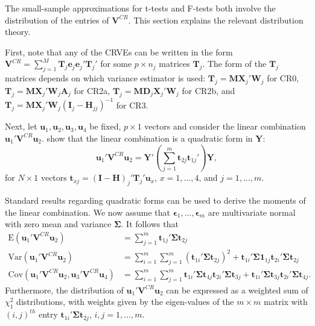 \documentclass[12pt]{article}\usepackage[]{graphicx}\usepackage[]{color}
\newcommand{\E}{\text{E}}
\newcommand{\Cov}{\text{Cov}}
\newcommand{\Var}{\text{Var}}
\newcommand{\bm}{\mathbf}
\newcommand{\bs}{\boldsymbol}
\begin{document}
The small-sample approximations for t-tests and F-tests both involve the distribution of the entries of $\bm{V}^{CR}$. This section explains the relevant distribution theory.

First, note that any of the CRVEs can be written in the form $\bm{V}^{CR} = \sum_{j=1}^M \bm{T}_j \bm{e}_j \bm{e}_j' \bm{T}_j'$ for some $p \times n_j$ matrices $\bm{T}_j$. 
The form of the $\bm{T}_j$ matrices depends on which variance estimator is used: $\bm{T}_j = \bm{M}\bm{X}_j' \bm{W}_j$ for CR0, $\bm{T}_j = \bm{M} \bm{X}_j' \bm{W}_j \bm{A}_j$ for CR2a, $\bm{T}_j = \bm{M} \bm{D}_j \bm{X}_j' \bm{W}_j$ for CR2b, and $\bm{T}_j = \bm{M} \bm{X}_j' \bm{W}_j \left(\bm{I}_j - \bm{H}_{jj}\right)^{-1}$ for CR3.

Next, let $\bm{u}_1,\bm{u}_2,\bm{u}_3,\bm{u}_4$ be fixed, $p \times 1$ vectors and consider the linear combination $\bm{u}_1' \bm{V}^{CR} \bm{u}_2$. 
\citet[Theorem 4]{Bell2002bias} show that the linear combination is a quadratic form in $\bm{Y}$: \[
\bm{u}_1' \bm{V}^{CR} \bm{u}_2 = \bm{Y}'\left(\sum_{j=1}^m \bm{t}_{2j} \bm{t}_{1j}'\right) \bm{Y}, \]
for $N \times 1$ vectors $\bm{t}_{xj} = \left(\bm{I} - \bm{H}\right)_j' \bm{T}_j' \bm{u}_x$, $x = 1,...,4$, and $j = 1,...,m$. 

Standard results regarding quadratic forms can be used to derive the moments of the linear combination. We now assume that $\bs\epsilon_1,...,\bs\epsilon_m$ are multivariate normal with zero mean and variance $\bs\Sigma$. It follows that 
\begin{align}
\E\left(\bm{u}_1' \bm{V}^{CR} \bm{u}_2\right) &= \sum_{j=1}^m \bm{t}_{1j}' \bs\Sigma \bm{t}_{2j} \\
\Var\left(\bm{u}_1' \bm{V}^{CR} \bm{u}_2\right) &= \sum_{i=1}^m \sum_{j=1}^m \left(\bm{t}_{1i}' \bs\Sigma \bm{t}_{2j}\right)^2 + \bm{t}_{1i}' \bs\Sigma \bm{1}_{1j} \bm{t}_{2i}' \bs\Sigma \bm{t}_{2j} \\
\Cov\left(\bm{u}_1' \bm{V}^{CR} \bm{u}_2, \bm{u}_3' \bm{V}^{CR} \bm{u}_4\right) &= \sum_{i=1}^m \sum_{j=1}^m \bm{t}_{1i}' \bs\Sigma \bm{t}_{4j} \bm{t}_{2i}' \bs\Sigma \bm{t}_{3j} + \bm{t}_{1i}' \bs\Sigma \bm{t}_{3j} \bm{t}_{2i}' \bs\Sigma \bm{t}_{4j}.
\end{align}
Furthermore, the distribution of $\bm{u}_1' \bm{V}^{CR} \bm{u}_2$ can be expressed as a weighted sum of $\chi^2_1$ distributions, with weights given by the eigen-values of the $m \times m$ matrix with $\left(i,j\right)^{th}$ entry $\bm{t}_{1i}' \bs\Sigma \bm{t}_{2j}$, $i,j=1,...,m$.




\end{document}
